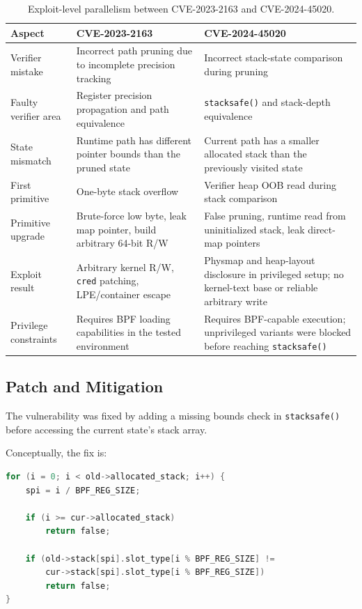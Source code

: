 \documentclass[../main.tex]{subfiles}
\begin{document}
\begin{table}[H]
\centering
\begin{tabularx}{\textwidth}{|l|X|X|}
\hline
\textbf{Aspect} & \textbf{CVE-2023-2163} & \textbf{CVE-2024-45020} \\
\hline
Verifier mistake & Incorrect path pruning due to incomplete precision tracking & Incorrect stack-state comparison during pruning \\
\hline
Faulty verifier area & Register precision propagation and path equivalence & \texttt{stacksafe()} and stack-depth equivalence \\
\hline
State mismatch & Runtime path has different pointer bounds than the pruned state & Current path has a smaller allocated stack than the previously visited state \\
\hline
First primitive & One-byte stack overflow & Verifier heap OOB read during stack comparison \\
\hline
Primitive upgrade & Brute-force low byte, leak map pointer, build arbitrary 64-bit R/W & False pruning, runtime read from uninitialized stack, leak direct-map pointers \\
\hline
Exploit result & Arbitrary kernel R/W, \texttt{cred} patching, LPE/container escape & Physmap and heap-layout disclosure in privileged setup; no kernel-text base or reliable arbitrary write \\
\hline
Privilege constraints & Requires BPF loading capabilities in the tested environment & Requires BPF-capable execution; unprivileged variants were blocked before reaching \texttt{stacksafe()} \\
\hline
\end{tabularx}
\caption{Exploit-level parallelism between CVE-2023-2163 and CVE-2024-45020.}
\end{table}

\subsection{Patch and Mitigation}

The vulnerability was fixed by adding a missing bounds check in \texttt{stacksafe()} before accessing the current state's stack array.

Conceptually, the fix is:

\begin{lstlisting}[language=C, caption={Conceptual model of the fix.}]
for (i = 0; i < old->allocated_stack; i++) {
    spi = i / BPF_REG_SIZE;

    if (i >= cur->allocated_stack)
        return false;

    if (old->stack[spi].slot_type[i % BPF_REG_SIZE] !=
        cur->stack[spi].slot_type[i % BPF_REG_SIZE])
        return false;
}
\end{lstlisting}
\end{document}
